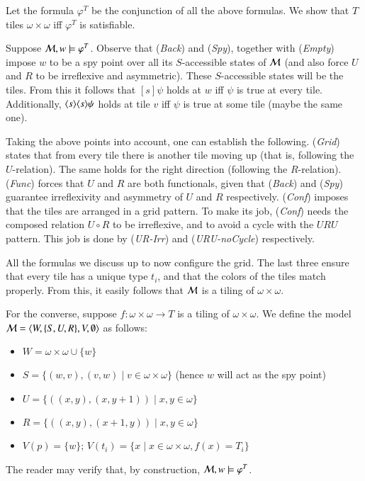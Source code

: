 \begin{pf}
Let the formula $\varphi^T$ be the conjunction of all the above
formulas. We show that $T$ tiles $\omega\times\omega$ iff
$\varphi^T$ is satisfiable.

Suppose $\mathcal{M},w\models\varphi^T$. Observe that (\textit{Back}) and
(\textit{Spy}), together with (\textit{Empty}) impose $w$ to be a
spy point over all its $S$-accessible states of $\mathcal{M}$ (and also
force $U$ and $R$ to be irreflexive and asymmetric). These
$S$-accessible states will be the tiles. From this it follows that
$[s]\psi$ holds at $w$ iff $\psi$ is true at every tile.
Additionally, $\langle s \rangle\langle s \rangle\psi$ holds at tile $v$ iff $\psi$ is
true at some tile (maybe the same one).

Taking the above points into account, one can establish the
following. (\textit{Grid}) states that from every tile there is
another tile moving up (that is, following the $U$-relation). The
same holds for the right direction (following the $R$-relation).
(\textit{Func}) forces that $U$ and $R$ are both functionals, given
that (\textit{Back}) and (\textit{Spy}) guarantee irreflexivity and
asymmetry of $U$ and $R$ respectively. (\textit{Conf}) imposes that
the tiles are arranged in a grid pattern. To make its job,
(\textit{Conf}) needs the composed relation $U\circ R$ to be
irreflexive, and to avoid a cycle with the $URU$ pattern. This job
is done by (\textit{UR-Irr}) and (\textit{URU-noCycle})
respectively.

All the formulas we discuss up to now configure the grid. The last
three ensure that every tile has a unique type $t_i$, and that the
colors of the tiles match properly. From this, it easily follows
that $\mathcal{M}$ is a tiling of $\omega\times\omega$.

For the converse, suppose $f:\omega\times\omega\to T$ is a tiling of
$\omega\times\omega$. We define the model
$\mathcal{M}=\langle W,\{S,U,R\},V,\emptyset \rangle$ as follows:
\begin{itemize}
\item $W=\omega\times\omega \cup \{w\}$
\item $S=\{(w,v),(v,w)\mid v\in\omega\times\omega\}$  (hence $w$ will act as the spy
point)
\item $U=\{((x,y),(x,y+1))\mid x,y\in\omega\}$
\item $R=\{((x,y),(x+1,y))\mid x,y\in\omega\}$
\item $V(p)=\{w\}$; $V(t_i)=\{x\mid x\in\omega\times\omega, f(x)=T_i\}$
\end{itemize}
The reader may verify that, by construction,
$\mathcal{M},w\models\varphi^T$.
\end{pf}

